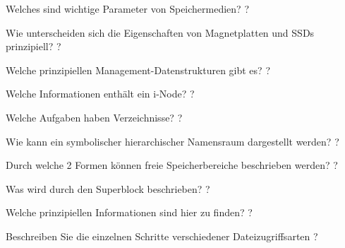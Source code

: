\documentclass[avery5371]{flashcards}
\begin{document}
\begin{flashcard}[Dateisysteme]{Welches sind wichtige Parameter von Speichermedien?}
    ?
\end{flashcard}

\begin{flashcard}[Dateisysteme]{Wie unterscheiden sich die Eigenschaften von Magnetplatten und SSDs prinzipiell?}
    ?
\end{flashcard}

\begin{flashcard}[Dateisysteme]{Welche prinzipiellen Management-Datenstrukturen gibt es?}
    ?
\end{flashcard}

\begin{flashcard}[Dateisysteme]{Welche Informationen enthält ein i-Node?}
    ?
\end{flashcard}

\begin{flashcard}[Dateisysteme]{Welche Aufgaben haben Verzeichnisse?}
    ?
\end{flashcard}

\begin{flashcard}[Dateisysteme]{Wie kann ein symbolischer hierarchischer Namensraum dargestellt werden?}
    ?
\end{flashcard}

\begin{flashcard}[Dateisysteme]{Durch welche 2 Formen können freie Speicherbereiche beschrieben werden?}
    ?
\end{flashcard}

\begin{flashcard}[Dateisysteme]{Was wird durch den Superblock beschrieben?}
    ?
\end{flashcard}

\begin{flashcard}[Dateisysteme]{Welche prinzipiellen Informationen sind hier zu finden?}
    ?
\end{flashcard}

\begin{flashcard}[Dateisysteme]{Beschreiben Sie die einzelnen Schritte verschiedener Dateizugriffsarten}
    ?
\end{flashcard}
\end{document}
